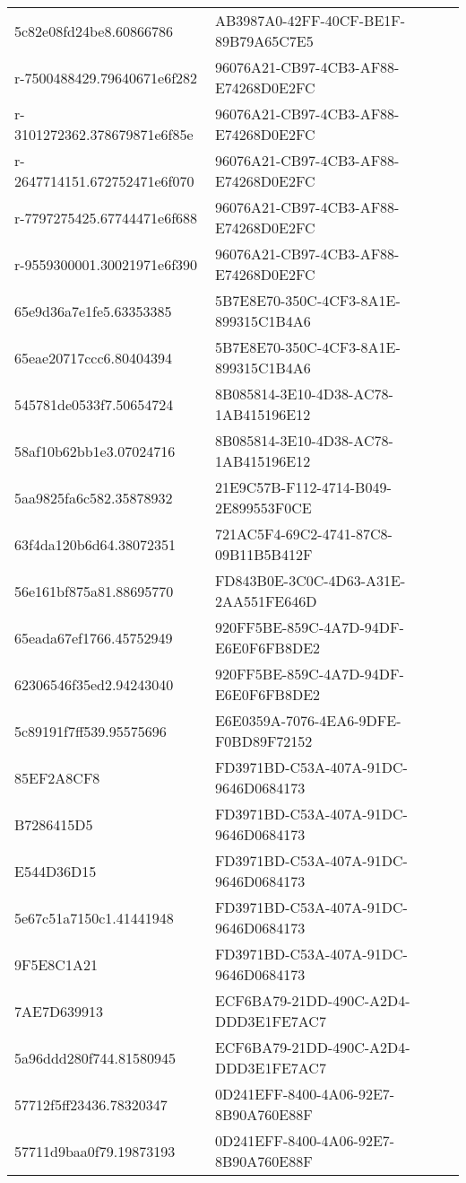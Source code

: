 \begin{tabular}{ll}
5c82e08fd24be8.60866786 & AB3987A0-42FF-40CF-BE1F-89B79A65C7E5 \\
r-7500488429.79640671e6f282 & 96076A21-CB97-4CB3-AF88-E74268D0E2FC \\
r-3101272362.378679871e6f85e & 96076A21-CB97-4CB3-AF88-E74268D0E2FC \\
r-2647714151.672752471e6f070 & 96076A21-CB97-4CB3-AF88-E74268D0E2FC \\
r-7797275425.67744471e6f688 & 96076A21-CB97-4CB3-AF88-E74268D0E2FC \\
r-9559300001.30021971e6f390 & 96076A21-CB97-4CB3-AF88-E74268D0E2FC \\
65e9d36a7e1fe5.63353385 & 5B7E8E70-350C-4CF3-8A1E-899315C1B4A6 \\
65eae20717ccc6.80404394 & 5B7E8E70-350C-4CF3-8A1E-899315C1B4A6 \\
545781de0533f7.50654724 & 8B085814-3E10-4D38-AC78-1AB415196E12 \\
58af10b62bb1e3.07024716 & 8B085814-3E10-4D38-AC78-1AB415196E12 \\
5aa9825fa6c582.35878932 & 21E9C57B-F112-4714-B049-2E899553F0CE \\
63f4da120b6d64.38072351 & 721AC5F4-69C2-4741-87C8-09B11B5B412F \\
56e161bf875a81.88695770 & FD843B0E-3C0C-4D63-A31E-2AA551FE646D \\
65eada67ef1766.45752949 & 920FF5BE-859C-4A7D-94DF-E6E0F6FB8DE2 \\
62306546f35ed2.94243040 & 920FF5BE-859C-4A7D-94DF-E6E0F6FB8DE2 \\
5c89191f7ff539.95575696 & E6E0359A-7076-4EA6-9DFE-F0BD89F72152 \\
85EF2A8CF8 & FD3971BD-C53A-407A-91DC-9646D0684173 \\
B7286415D5 & FD3971BD-C53A-407A-91DC-9646D0684173 \\
E544D36D15 & FD3971BD-C53A-407A-91DC-9646D0684173 \\
5e67c51a7150c1.41441948 & FD3971BD-C53A-407A-91DC-9646D0684173 \\
9F5E8C1A21 & FD3971BD-C53A-407A-91DC-9646D0684173 \\
7AE7D639913 & ECF6BA79-21DD-490C-A2D4-DDD3E1FE7AC7 \\
5a96ddd280f744.81580945 & ECF6BA79-21DD-490C-A2D4-DDD3E1FE7AC7 \\
57712f5ff23436.78320347 & 0D241EFF-8400-4A06-92E7-8B90A760E88F \\
57711d9baa0f79.19873193 & 0D241EFF-8400-4A06-92E7-8B90A760E88F \\

\end{tabular}
